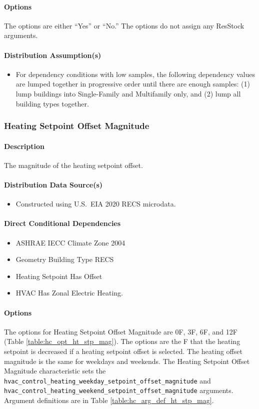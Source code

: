 \paragraph{Options}
The options are either ``Yes'' or ``No.'' The options do not assign any ResStock arguments.

\paragraph{Distribution Assumption(s)}
\begin{itemize}
    \item For dependency conditions with low samples, the following dependency values are lumped together in progressive order until there are enough samples: (1) lump buildings into Single-Family and Multifamily only, and (2) lump all building types together.
\end{itemize}

\subsubsection{Heating Setpoint Offset Magnitude}
\paragraph{Description}
The magnitude of the heating setpoint offset.

\paragraph{Distribution Data Source(s)}
\begin{itemize}
    \item Constructed using U.S.~EIA 2020 RECS microdata.
\end{itemize}

\paragraph{Direct Conditional Dependencies}
\begin{itemize}
    \item ASHRAE IECC Climate Zone 2004
    \item Geometry Building Type RECS
    \item Heating Setpoint Has Offset
    \item HVAC Has Zonal Electric Heating.
\end{itemize}

\paragraph{Options}
The options for Heating Setpoint Offset Magnitude are 0F, 3F, 6F, and 12F (Table \ref{table:hc_opt_ht_stp_mag}). The options are the \degree F that the heating setpoint is decreased if a heating setpoint offset is selected. The heating offset magnitude is the same for weekdays and weekends. The Heating Setpoint Offset Magnitude characteristic sets the \texttt{hvac\_control\_heating\_weekday\_setpoint\_offset\_magnitude} and \texttt{hvac\_control\_heating\_weekend\_setpoint\_offset\_magnitude} arguments. Argument definitions are in Table \ref{table:hc_arg_def_ht_stp_mag}.

